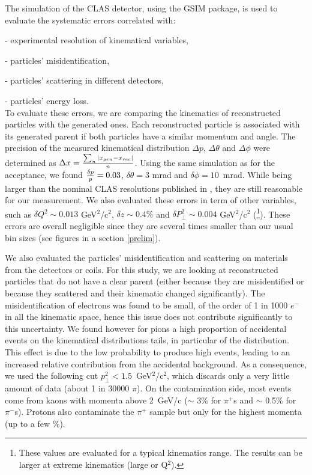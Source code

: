 The simulation of the CLAS detector, using the GSIM package, is used 
to evaluate the systematic errors correlated with:

  - experimental resolution of kinematical variables,

  - particles' misidentification,

  - particles' scattering in different detectors,

  - particles' energy loss.\\


To evaluate these errors, we are comparing the kinematics of reconstructed 
particles with the generated ones. Each reconstructed particle is associated 
with its generated parent if both particles have a similar momentum and 
angle. The precision of the measured kinematical distribution 
$\Delta p$, $\Delta \theta$ and $\Delta \phi$ were determined as $\Delta x = 
{\sum_n |x_{gen} - x_{rec}| \over n}$. Using the same simulation as for 
the acceptance, we found 
${\delta p \over p } = 0.03$, $\delta \theta = 3$ mrad and $\delta \phi = 
10$~mrad. While being larger than the nominal CLAS resolutions published in 
\cite{Mecking:2003zu}, they are still reasonable for our measurement. We also 
evaluated these errors in term of other variables, such as 
$\delta Q^2 \sim 0.013$ GeV$^2$/c$^2$, $\delta z \sim 0.4 \%$ and $\delta 
P_\perp^2 \sim 0.004$ GeV$^2$/c$^2$ (\footnote{These values are evaluated for 
a typical kinematics range. The results can be larger at extreme kinematics 
(large \pt or Q$^2$).}). These errors are overall negligible since they are 
several times smaller than our usual bin sizes (see figures in a section 
\ref{prelim}). 

We also evaluated the particles' misidentification and scattering on materials
from the detectors or coils. For this study, we are looking at reconstructed 
particles that do not have a clear parent (either because they are misidentified
or because they scattered and their kinematic changed significantly). The 
misidentification of electrons was found to be small, of the order of 1 in 
1000 $e^-$ in all the kinematic space, hence this issue does not contribute 
significantly to this uncertainty. We found however for pions
a high proportion of accidental events on the kinematical distributions tails, 
in particular of the \pt distribution. This effect is due to the low 
probability to produce high \pt events, leading to an increased relative 
contribution from the accidental background. As a consequence, we used the 
following cut $p_\perp^2 < 1.5$~GeV$^2$/c$^2$, which discards only a very 
little amount of data (about 1 in 30000 $\pi$). On the contamination side,
most events come from kaons with momenta above 2~GeV/c ($\sim$ 3\% for 
$\pi^+$s and $\sim$ 0.5\% for $\pi^-$s). Protons also contaminate the 
$\pi^+$ sample but only for the highest momenta (up to a few \%). 

